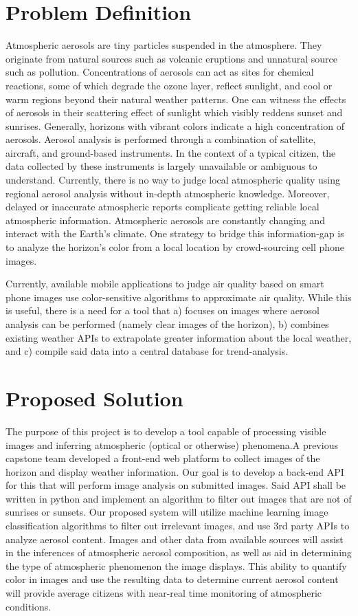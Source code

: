 \documentclass[letterpaper,10pt,draftclsnofoot,onecolumn]{IEEEtran}
\begin{document}
\clearpage
\begin{flushleft}
\section{Problem Definition}
Atmospheric aerosols are tiny particles suspended in the atmosphere. They originate from natural sources such as volcanic eruptions and unnatural source such as pollution. Concentrations of aerosols can act as sites for chemical reactions, some of which degrade the ozone layer, reflect sunlight, and cool or warm regions beyond their natural weather patterns. One can witness the effects of aerosols in their scattering effect of sunlight which visibly reddens sunset and sunrises. Generally, horizons with vibrant colors indicate a high concentration of aerosols. Aerosol analysis is performed through a combination of satellite, aircraft, and ground-based instruments. In the context of a typical citizen, the data collected by these instruments is largely unavailable or ambiguous to understand. Currently, there is no way to judge local atmospheric quality using regional aerosol analysis without in-depth atmospheric knowledge. Moreover, delayed or inaccurate atmospheric reports complicate getting reliable local atmospheric information. Atmospheric aerosols are constantly changing and interact with the Earth's climate. One strategy to bridge this information-gap is to analyze the horizon's color from a local location by crowd-sourcing cell phone images. 
 
Currently, available mobile applications to judge air quality based on smart phone images use color-sensitive algorithms to approximate air quality. While this is useful, there is a need for a tool that a) focuses on images where aerosol analysis can be performed (namely clear images of the horizon), b) combines existing weather APIs to extrapolate greater information about the local weather, and c) compile said data into a central database for trend-analysis.

\section{Proposed Solution}
The purpose of this project is to develop a tool capable of processing visible images and inferring atmospheric (optical or otherwise) phenomena.A previous capstone team developed a front-end web platform to collect images of the horizon and display weather information. Our goal is to develop a back-end API for this  that will perform image analysis on submitted images. Said API shall be written in python and implement an algorithm to filter out images that are not of sunrises or sunsets.  
Our proposed system will utilize machine learning image classification algorithms to filter out irrelevant images, and use 3rd party APIs to analyze aerosol content. 
Images and other data from available sources will assist in the inferences of atmospheric aerosol composition, as well as aid in determining the type of atmospheric phenomenon the image displays.
This ability to quantify color in images and use the resulting data to determine current aerosol content will provide average citizens with near-real time monitoring of atmospheric conditions.


\end{flushleft}
\end{document}
